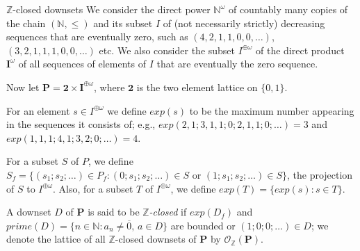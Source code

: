 \documentclass[professionalfont, handout, 10pt]{beamer} %
\theoremstyle{plain}
\theoremstyle{definition}
\newcommand{\m}[1]{{\mathbf {#1} }}
\newcommand{\bb}[1]{\mathbb {#1}}
\begin{document}
\begin{frame}{$\bb{Z}$-closed downsets}
    We consider the direct power $\bb{N}^\omega$ of countably many copies of the chain $(\mathbb{N}, \leq)$ and its subset $I$ of (not necessarily strictly) decreasing sequences that are eventually zero, such as $(4, 2, 1, 1, 0, 0, \dots)$, $(3, 2, 1, 1, 1, 0, 0, \dots)$ etc.
    We also consider  the subset $I^{\oplus \omega}$ of the direct product $\m I^\omega$ of all sequences of elements of $I$ that are eventually the zero sequence.\pause
    
    Now let $\m{P} = \m 2 \times \m I^{\oplus \omega}$, where $\m 2$ is the two element lattice on $\{0,1\}$.\pause
    
    For an element $s \in I^{\oplus \omega}$ we define $exp(s)$ to be the maximum number appearing in the sequences it consists of; e.g., $exp(2, 1; 3, 1, 1; 0; 2, 1, 1; 0; \dots)=3$ and $exp(1, 1, 1; 4, 1; 3, 2; 0; \dots)=4$.\pause
    
    For a subset $S$ of $P$, we define $S_f = \{(s_1; s_2; \dots) \in P_f: (0; s_1; s_2; \dots) \in S \text{ or } (1; s_1; s_2; \dots) \in S\}$, the projection of $S$ to $I^{\oplus \omega}$.
    Also, for a subset $T$ of $I^{\oplus \omega}$, we define $exp(T) =\{exp(s): s \in T\}$.\pause

    A downset $D$ of $\m{P}$ is said to be \emph{$\bb{Z}$-closed} if $exp(D_f)$ and $prime(D) = \{n \in \bb{N}: a_n \neq \overline{0}, \, a \in D\}$ are bounded or $(1; 0; 0; \dots) \in D$; we denote the lattice of all $\bb{Z}$-closed downsets of $\m{P}$ by $\mathcal{O}_{\bb{Z}}(\m{P})$.
\end{frame}
\end{document}
